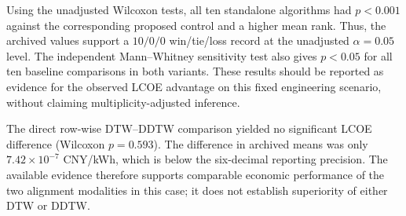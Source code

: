 Using the unadjusted Wilcoxon tests, all ten standalone algorithms had
$p<0.001$ against the corresponding proposed control and a higher mean rank.
Thus, the archived values support a $10/0/0$ win/tie/loss record at the
unadjusted $\alpha=0.05$ level. The independent Mann--Whitney sensitivity
test also gives $p<0.05$ for all ten baseline comparisons in both variants.
These results should be reported as evidence for the observed LCOE advantage
on this fixed engineering scenario, without claiming multiplicity-adjusted
inference.

The direct row-wise DTW--DDTW comparison yielded no significant LCOE
difference (Wilcoxon $p=0.593$). The difference in archived means was only
$7.42\times10^{-7}$ CNY/kWh, which is below the six-decimal reporting
precision. The available evidence therefore supports comparable economic
performance of the two alignment modalities in this case; it does not
establish superiority of either DTW or DDTW.

\begin{table}[p]
\centering
\scriptsize
\caption{Archived LCOE inferential comparison for HRES2--H2. The reported
pairwise values are unadjusted Wilcoxon signed-rank $p$-values.}
\label{tab:hres2_revision_inference}
\end{table}

